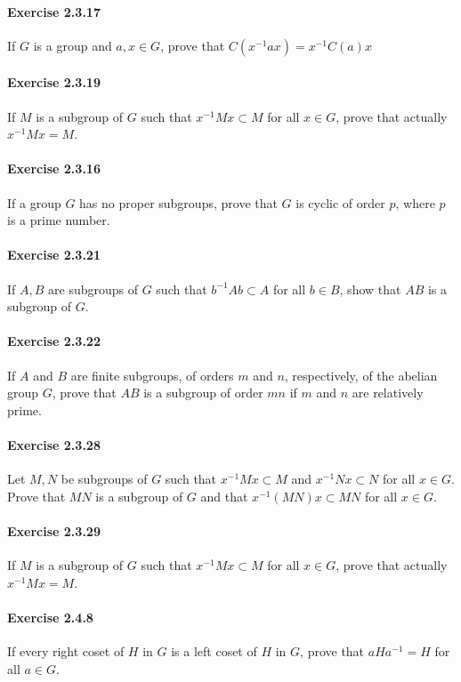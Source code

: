 \documentclass{article}
\begin{document}
\paragraph{Exercise 2.3.17} If $G$ is a group and $a, x \in G$, prove that $C\left(x^{-1} a x\right)=x^{-1} C(a) x$

\paragraph{Exercise 2.3.19} If $M$ is a subgroup of $G$ such that $x^{-1} M x \subset M$ for all $x \in G$, prove that actually $x^{-1} M x=M$. 

\paragraph{Exercise 2.3.16} If a group $G$ has no proper subgroups, prove that $G$ is cyclic of order $p$, where $p$ is a prime number.

\paragraph{Exercise 2.3.21} If $A, B$ are subgroups of $G$ such that $b^{-1} Ab \subset A$ for all $b \in B$, show that $AB$ is a subgroup of $G$.

\paragraph{Exercise 2.3.22} If $A$ and $B$ are finite subgroups, of orders $m$ and $n$, respectively, of the abelian group $G$, prove that $AB$ is a subgroup of order $mn$ if $m$ and $n$ are relatively prime.

\paragraph{Exercise 2.3.28} Let $M, N$ be subgroups of $G$ such that $x^{-1}Mx \subset M$ and $x^{-1} N x \subset N$ for all $x \in G$. Prove that $MN$ is a subgroup of $G$ and that $x^{-1} (MN)x \subset MN$ for all $x \in G$.

\paragraph{Exercise 2.3.29} If $M$ is a subgroup of $G$ such that $x^{-1}Mx \subset M$ for all $x \in G$, prove that actually $x^{-1}Mx = M$.

\paragraph{Exercise 2.4.8} If every right coset of $H$ in $G$ is a left coset of $H$ in $G$, prove that $aHa^{-1} = H$ for all $a \in G$.
\end{document}
